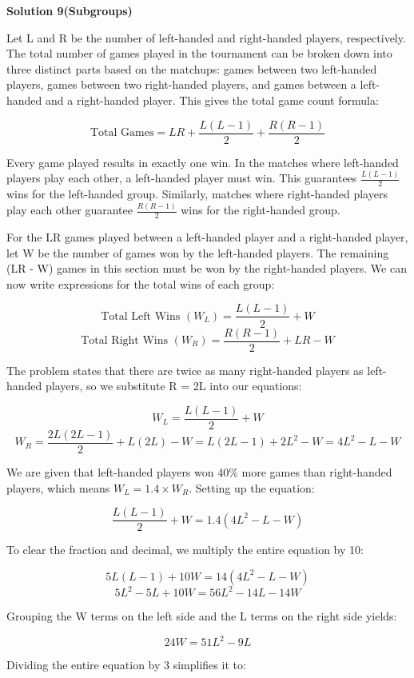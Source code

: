 \begin{enumerate}
 



\textbf{Solution 9(Subgroups)}

Let L and R be the number of left-handed and right-handed players, respectively. The total number of games played in the tournament can be broken down into three distinct parts based on the matchups: games between two left-handed players, games between two right-handed players, and games between a left-handed and a right-handed player. This gives the total game count formula:

 
 \[\text{Total Games} = LR + \frac{L(L-1)}{2} + \frac{R(R-1)}{2}\]

 Every game played results in exactly one win. In the matches where left-handed players play each other, a left-handed player must win. This guarantees $\frac{L(L-1)}{2}$ wins for the left-handed group. Similarly, matches where right-handed players play each other guarantee $\frac{R(R-1)}{2}$ wins for the right-handed group. 

 For the LR games played between a left-handed player and a right-handed player, let W be the number of games won by the left-handed players. The remaining (LR - W) games in this section must be won by the right-handed players. We can now write expressions for the total wins of each group:

 
 \[\text{Total Left Wins } (W_L) = \frac{L(L-1)}{2} + W\]
 \[\text{Total Right Wins } (W_R) = \frac{R(R-1)}{2} + LR - W\]

 The problem states that there are twice as many right-handed players as left-handed players, so we substitute R = 2L into our equations:

 
 \[W_L = \frac{L(L-1)}{2} + W\]
 \[W_R = \frac{2L(2L-1)}{2} + L(2L) - W = L(2L-1) + 2L^2 - W = 4L^2 - L - W\]

 We are given that left-handed players won 40\% more games than right-handed players, which means $W_L = 1.4 \times W_R$. Setting up the equation:

 
 \[\frac{L(L-1)}{2} + W = 1.4(4L^2 - L - W)\]

 To clear the fraction and decimal, we multiply the entire equation by 10:

 
 \[5L(L-1) + 10W = 14(4L^2 - L - W)\]
 \[5L^2 - 5L + 10W = 56L^2 - 14L - 14W\]

 Grouping the W terms on the left side and the L terms on the right side yields:

 
 \[24W = 51L^2 - 9L\]

 Dividing the entire equation by 3 simplifies it to:


\end{enumerate}
